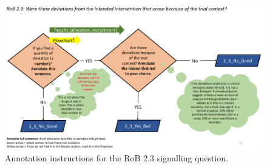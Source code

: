 \documentclass[sn-mathphys,Numbered]{sn-jnl}%
\begin{document}
%
%
%
\begin{figure}[hbt]
    \centering
    \includegraphics[width=\textwidth]{figures/2_3.pdf}
    \caption{Annotation instructions for the RoB 2.3 signalling question.}
    \label{fig:2_3}
\end{figure}
%
%
%
\end{document}
